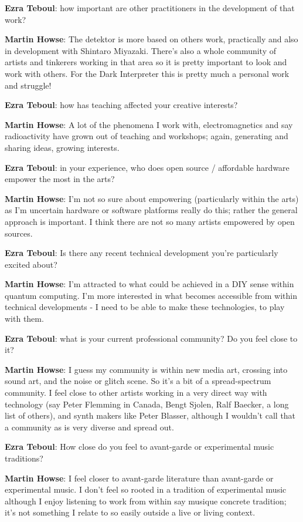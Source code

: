 \textbf{Ezra Teboul}: how important are other practitioners in the development of that
work?

\textbf{Martin Howse}: The detektor is more based on others work, practically and also
in development with Shintaro Miyazaki. There's also a whole community of artists and
tinkerers working in that area so it is pretty important to look and work with others.
For the Dark Interpreter this is pretty much a personal work and struggle!

\textbf{Ezra Teboul}: how has teaching affected your creative interests?

\textbf{Martin Howse}: A lot of the phenomena I work with, electromagnetics and say
radioactivity have grown out of teaching and workshops; again, generating and sharing
ideas, growing interests.

\textbf{Ezra Teboul}: in your experience, who does open source / affordable hardware
empower the most in the arts?

\textbf{Martin Howse}: I'm not so sure about empowering (particularly within the arts)
as I'm uncertain hardware or software platforms really do this; rather the general
approach is important. I think there are not so many artists empowered by open sources.

\textbf{Ezra Teboul}: Is there any recent technical development you're particularly
excited about?

\textbf{Martin Howse}: I'm attracted to what could be achieved in a DIY sense within
quantum computing. I'm more interested in what becomes accessible from within technical
developments - I need to be able to make these technologies, to play with them.

\textbf{Ezra Teboul}: what is your current professional community? Do you feel close to
it?

\textbf{Martin Howse}: I guess my community is within new media art, crossing into sound
art, and the noise or glitch scene. So it's a bit of a spread-spectrum community. I feel
close to other artists working in a very direct way with technology (say Peter Flemming
in Canada, Bengt Sjolen, Ralf Baecker, a long list of others), and synth makers like
Peter Blasser, although I wouldn't call that a community as is very diverse and spread
out.

\textbf{Ezra Teboul}: How close do you feel to avant-garde or experimental music
traditions?

\textbf{Martin Howse}: I feel closer to avant-garde literature than avant-garde or
experimental music. I don't feel so rooted in a tradition of experimental music although
I enjoy listening to work from within say musique concrete tradition; it's not something
I relate to so easily outside a live or living context.

